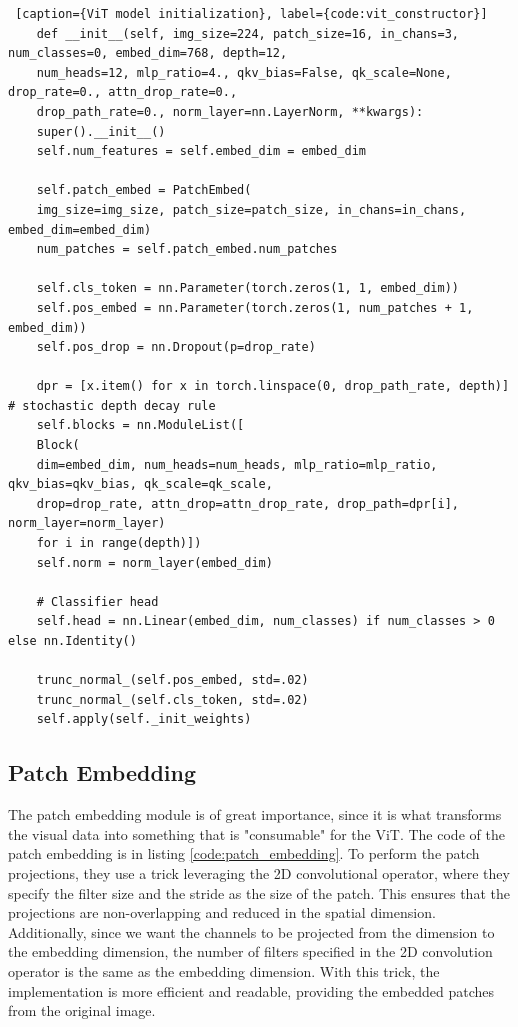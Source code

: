 \begin{lstlisting} [caption={ViT model initialization}, label={code:vit_constructor}]
	def __init__(self, img_size=224, patch_size=16, in_chans=3, num_classes=0, embed_dim=768, depth=12,
	num_heads=12, mlp_ratio=4., qkv_bias=False, qk_scale=None, drop_rate=0., attn_drop_rate=0.,
	drop_path_rate=0., norm_layer=nn.LayerNorm, **kwargs):
	super().__init__()
	self.num_features = self.embed_dim = embed_dim
	
	self.patch_embed = PatchEmbed(
	img_size=img_size, patch_size=patch_size, in_chans=in_chans, embed_dim=embed_dim)
	num_patches = self.patch_embed.num_patches
	
	self.cls_token = nn.Parameter(torch.zeros(1, 1, embed_dim))
	self.pos_embed = nn.Parameter(torch.zeros(1, num_patches + 1, embed_dim))
	self.pos_drop = nn.Dropout(p=drop_rate)
	
	dpr = [x.item() for x in torch.linspace(0, drop_path_rate, depth)]  # stochastic depth decay rule
	self.blocks = nn.ModuleList([
	Block(
	dim=embed_dim, num_heads=num_heads, mlp_ratio=mlp_ratio, qkv_bias=qkv_bias, qk_scale=qk_scale,
	drop=drop_rate, attn_drop=attn_drop_rate, drop_path=dpr[i], norm_layer=norm_layer)
	for i in range(depth)])
	self.norm = norm_layer(embed_dim)
	
	# Classifier head
	self.head = nn.Linear(embed_dim, num_classes) if num_classes > 0 else nn.Identity()
	
	trunc_normal_(self.pos_embed, std=.02)
	trunc_normal_(self.cls_token, std=.02)
	self.apply(self._init_weights)
\end{lstlisting}

\subsection{Patch Embedding}
The patch embedding module is of great importance, since it is what transforms the visual data into something that is "consumable" for the ViT. The code of the patch embedding is in listing \ref{code:patch_embedding}. To perform the patch projections, they use a trick leveraging the 2D convolutional operator, where they specify the filter size and the stride as the size of the patch. This ensures that the projections are non-overlapping and reduced in the spatial dimension. Additionally, since we want the channels to be projected from the  dimension to the embedding dimension, the number of filters specified in the 2D convolution operator is the same as the embedding dimension. With this trick, the implementation is more efficient and readable, providing the embedded patches from the original image.

